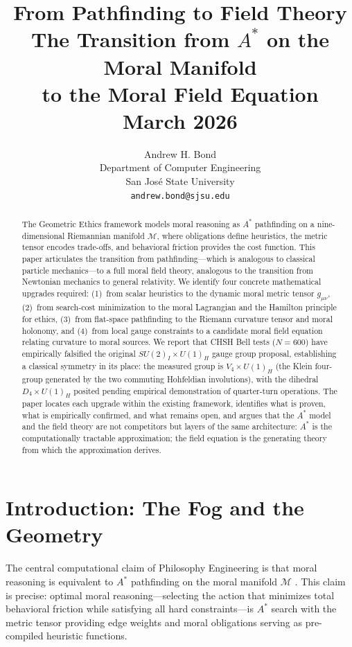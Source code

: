 \documentclass[12pt,letterpaper]{article}
\title{%
\vspace{-1cm}
{\LARGE\textbf{From Pathfinding to Field Theory}}\\[0.8em]
{\Large The Transition from $A^*$ on the Moral Manifold\\to the Moral Field Equation}\\[1em]
{\normalsize March 2026}
}
\author{Andrew H. Bond\\
Department of Computer Engineering\\
San Jos\'{e} State University\\
\texttt{andrew.bond@sjsu.edu}}
\date{}
\theoremstyle{definition}
\newcommand{\calM}{\mathcal{M}}
\begin{document}
\maketitle

\begin{abstract}
The Geometric Ethics framework models moral reasoning as $A^*$ pathfinding on a nine-dimensional Riemannian manifold $\calM$, where obligations define heuristics, the metric tensor encodes trade-offs, and behavioral friction provides the cost function. This paper articulates the transition from pathfinding---which is analogous to classical particle mechanics---to a full moral field theory, analogous to the transition from Newtonian mechanics to general relativity. We identify four concrete mathematical upgrades required: (1)~from scalar heuristics to the dynamic moral metric tensor $g_{\mu\nu}$, (2)~from search-cost minimization to the moral Lagrangian and the Hamilton principle for ethics, (3)~from flat-space pathfinding to the Riemann curvature tensor and moral holonomy, and (4)~from local gauge constraints to a candidate moral field equation relating curvature to moral sources. We report that CHSH Bell tests ($N = 600$) have empirically falsified the original $SU(2)_I \times U(1)_H$ gauge group proposal, establishing a classical symmetry in its place: the measured group is $V_4 \times U(1)_H$ (the Klein four-group generated by the two commuting Hohfeldian involutions), with the dihedral $D_4 \times U(1)_H$ posited pending empirical demonstration of quarter-turn operations. The paper locates each upgrade within the existing framework, identifies what is proven, what is empirically confirmed, and what remains open, and argues that the $A^*$ model and the field theory are not competitors but layers of the same architecture: $A^*$ is the computationally tractable approximation; the field equation is the generating theory from which the approximation derives.
\end{abstract}

\tableofcontents

\section{Introduction: The Fog and the Geometry}

The central computational claim of Philosophy Engineering is that moral reasoning is equivalent to $A^*$ pathfinding on the moral manifold $\calM$ \cite{bond2026pe}. This claim is precise: optimal moral reasoning---selecting the action that minimizes total behavioral friction while satisfying all hard constraints---is $A^*$ search with the metric tensor providing edge weights and moral obligations serving as pre-compiled heuristic functions.
\end{document}
